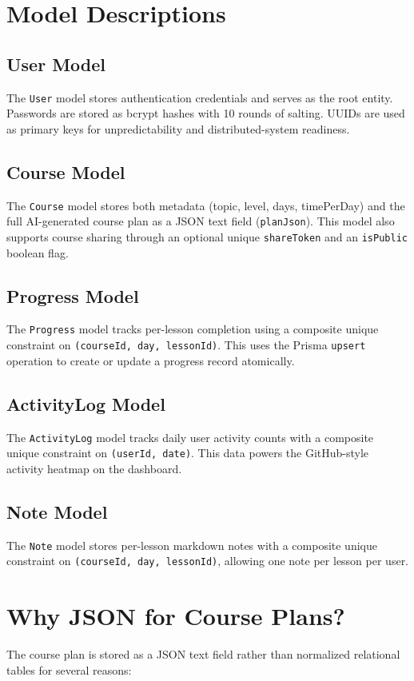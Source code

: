 \documentclass[12pt,a4paper]{report}
\begin{document}
\section{Model Descriptions}

\subsection{User Model}
The \texttt{User} model stores authentication credentials and serves as the root entity. Passwords are stored as bcrypt hashes with 10 rounds of salting. UUIDs are used as primary keys for unpredictability and distributed-system readiness.

\subsection{Course Model}
The \texttt{Course} model stores both metadata (topic, level, days, timePerDay) and the full AI-generated course plan as a JSON text field (\texttt{planJson}). This model also supports course sharing through an optional unique \texttt{shareToken} and an \texttt{isPublic} boolean flag.

\subsection{Progress Model}
The \texttt{Progress} model tracks per-lesson completion using a composite unique constraint on \texttt{(courseId, day, lessonId)}. This uses the Prisma \texttt{upsert} operation to create or update a progress record atomically.

\subsection{ActivityLog Model}
The \texttt{ActivityLog} model tracks daily user activity counts with a composite unique constraint on \texttt{(userId, date)}. This data powers the GitHub-style activity heatmap on the dashboard.

\subsection{Note Model}
The \texttt{Note} model stores per-lesson markdown notes with a composite unique constraint on \texttt{(courseId, day, lessonId)}, allowing one note per lesson per user.

\section{Why JSON for Course Plans?}
The course plan is stored as a JSON text field rather than normalized relational tables for several reasons:
\end{document}
